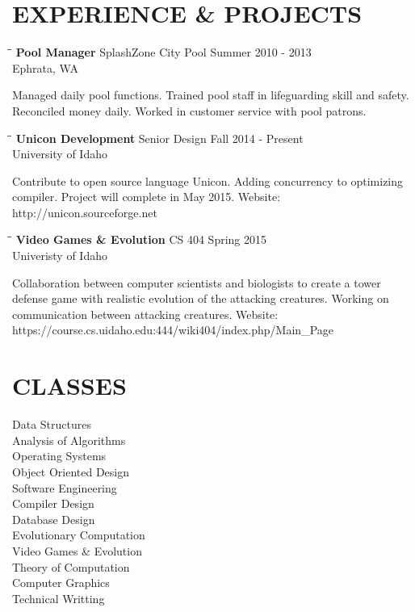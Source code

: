 \begin{resume}
\section{EXPERIENCE \& PROJECTS}
   \vspace{-0.1in}	
   \begin{tabbing}
   \hspace{2.3in}\= \hspace{2.6in}\= \kill %
    {\bf Pool Manager} \>SplashZone City Pool     \>Summer 2010 - 2013\\
                             \>Ephrata, WA
   \end{tabbing}\vspace{-20pt}      %
   Managed daily pool functions. Trained pool staff in lifeguarding skill
   and safety. Reconciled money daily. Worked in customer service with pool
   patrons.
   \begin{tabbing}
   \hspace{2.3in}\= \hspace{2.6in}\= \kill %
    {\bf Unicon Development} \>Senior Design \> Fall 2014 - Present\\
                          \>University of Idaho
   \end{tabbing}\vspace{-20pt}
   Contribute to open source language Unicon. Adding concurrency to
   optimizing compiler. Project will complete in May 2015.
   Website: http://unicon.sourceforge.net
   \begin{tabbing}
     \hspace{2.3in}\= \hspace{2.6in}\= \kill
            {\bf Video Games \& Evolution } \> CS 404 \> Spring 2015 \\
            \> Univeristy of Idaho
   \end{tabbing}\vspace{-20pt}
   Collaboration between computer scientists and biologists to create a tower defense game
   with realistic evolution of the attacking creatures. Working on communication between
   attacking creatures. Website: https://course.cs.uidaho.edu:444/wiki404/index.php/Main\_Page
 
\section{CLASSES}          
Data Structures \\
Analysis of Algorithms \\
Operating Systems \\
Object Oriented Design \\
Software Engineering \\
Compiler Design \\
Database Design \\
Evolutionary Computation \\
Video Games \& Evolution \\
Theory of Computation \\
Computer Graphics  \\
Technical Writting
 

\end{resume}
